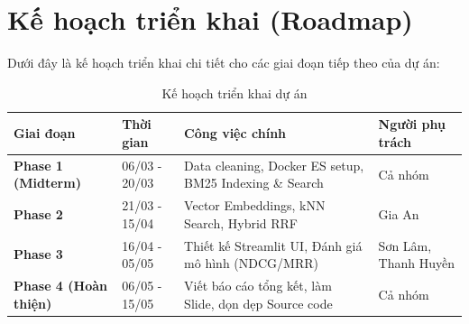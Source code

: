\chapter{Kế hoạch triển khai (Roadmap)}

Dưới đây là kế hoạch triển khai chi tiết cho các giai đoạn tiếp theo của dự án:

\begin{table}[H]
\centering
\begin{tabular}{|p{3cm}|p{3cm}|p{6cm}|p{3cm}|}
\hline
\textbf{Giai đoạn} & \textbf{Thời gian} & \textbf{Công việc chính} & \textbf{Người phụ trách} \\ \hline
\textbf{Phase 1 (Midterm)} & 06/03 - 20/03 & Data cleaning, Docker ES setup, BM25 Indexing \& Search & Cả nhóm \\ \hline
\textbf{Phase 2} & 21/03 - 15/04 & Vector Embeddings, kNN Search, Hybrid RRF & Gia An \\ \hline
\textbf{Phase 3} & 16/04 - 05/05 & Thiết kế Streamlit UI, Đánh giá mô hình (NDCG/MRR) & Sơn Lâm, Thanh Huyền \\ \hline
\textbf{Phase 4 (Hoàn thiện)} & 06/05 - 15/05 & Viết báo cáo tổng kết, làm Slide, dọn dẹp Source code & Cả nhóm \\ \hline
\end{tabular}
\caption{Kế hoạch triển khai dự án}
\end{table}
